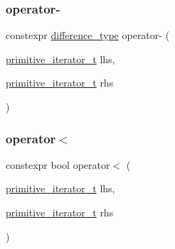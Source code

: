 \subsubsection{\texorpdfstring{operator-\/}{operator-}}
{\footnotesize\ttfamily constexpr \mbox{\hyperlink{classnlohmann_1_1detail_1_1primitive__iterator__t_af3db0d5c90de427d51645fe73a015553}{difference\+\_\+type}} operator-\/ (\begin{DoxyParamCaption}\item[{\mbox{\hyperlink{classnlohmann_1_1detail_1_1primitive__iterator__t}{primitive\+\_\+iterator\+\_\+t}}}]{lhs,  }\item[{\mbox{\hyperlink{classnlohmann_1_1detail_1_1primitive__iterator__t}{primitive\+\_\+iterator\+\_\+t}}}]{rhs }\end{DoxyParamCaption})\hspace{0.3cm}{\ttfamily [friend]}}

\mbox{\label{classnlohmann_1_1detail_1_1primitive__iterator__t_a901a95e6d73c9509d3dcde914f6c8a9d}} 
\subsubsection{\texorpdfstring{operator$<$}{operator<}}
{\footnotesize\ttfamily constexpr bool operator$<$ (\begin{DoxyParamCaption}\item[{\mbox{\hyperlink{classnlohmann_1_1detail_1_1primitive__iterator__t}{primitive\+\_\+iterator\+\_\+t}}}]{lhs,  }\item[{\mbox{\hyperlink{classnlohmann_1_1detail_1_1primitive__iterator__t}{primitive\+\_\+iterator\+\_\+t}}}]{rhs }\end{DoxyParamCaption})\hspace{0.3cm}{\ttfamily [friend]}}

\mbox{\label{classnlohmann_1_1detail_1_1primitive__iterator__t_aae1e1e2ec0e229d1291d69de57d76bbe}} 
